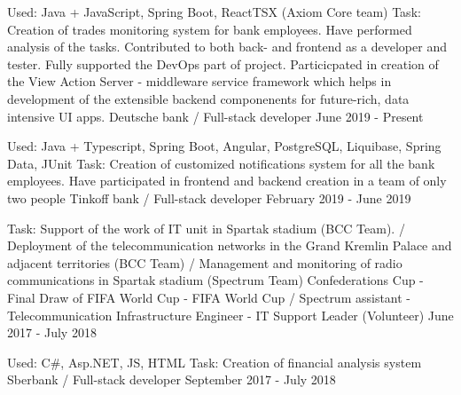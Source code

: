 

\vspace{0cm}\begin{cventries}
\cventry
{Used: Java + JavaScript, Spring Boot, ReactTSX (Axiom Core team)
	\newline Task: Creation of trades monitoring system for bank employees. Have performed analysis of the tasks. Contributed to both back- and frontend as a developer and tester. Fully supported the DevOps part of project.	
	\newline Particicpated in creation of the View Action Server - middleware service  framework which helps in development of the extensible backend componenents for future-rich, data intensive UI apps.
} %
{Deutsche bank / Full-stack developer} %
{} %
{June 2019 - Present} %
\noindent	
	
\cventry
{Used: Java + Typescript, Spring Boot, Angular, PostgreSQL, Liquibase, Spring Data, JUnit
	\newline Task: Creation of customized notifications system for all the bank employees. Have participated in frontend and backend creation in a team of only two people} %
{Tinkoff bank / Full-stack developer } %
{} %
{February 2019 - June 2019} %
\noindent	
	
\cventry
{Task: Support of the work of IT unit in Spartak stadium (BCC Team). /
Deployment of the telecommunication networks in the Grand Kremlin Palace and adjacent territories (BCC Team) /
Management and monitoring of radio communications in Spartak stadium (Spectrum Team)} %
{Confederations Cup - Final Draw of FIFA World Cup - FIFA World Cup / 
	Spectrum assistant - Telecommunication Infrastructure Engineer  - IT Support Leader (Volunteer)} %
{} %
{June 2017 - July 2018} %
\noindent	

\cventry
{Used: C\#, Asp.NET, JS, HTML
	\newline Task: Creation of financial analysis system} %
{Sberbank / Full-stack developer} %
{} %
{September 2017 - July 2018} %
\noindent	


\end{cventries}
